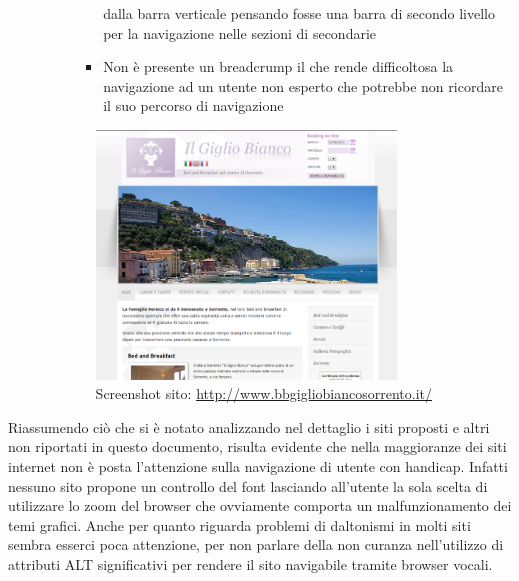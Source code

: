 \documentclass[a4paper,12pt,hidelinks]{report}
\begin{document}
\begin{itemize}
\begin{itemize}
\begin{itemize}
\begin{itemize}
	   dalla barra verticale pensando fosse una barra di secondo livello per la navigazione nelle sezioni di secondarie
	   \item Non è presente un breadcrump il che rende difficoltosa la navigazione ad un utente non esperto che potrebbe non ricordare il suo percorso di navigazione
	  \end{itemize}
	\end{itemize}
	\begin{figure}[h!]%
	    \includegraphics[width=0.80\textwidth,keepaspectratio=true]{../img/bebGiglio}
	    \centering
	    \caption{Screenshot sito: \url{http://www.bbgigliobiancosorrento.it/}}%
	    \label{fig:bebGiglio}%
	\end{figure}
    \end{itemize}
  \end{itemize}
  Riassumendo ciò che si è notato analizzando nel dettaglio i siti proposti e altri non riportati in questo documento, risulta evidente che nella maggioranze dei siti internet
  non è posta l'attenzione sulla navigazione di utente con handicap. Infatti nessuno sito propone un controllo del font lasciando all'utente la sola scelta di utilizzare 
  lo zoom del browser che ovviamente comporta un malfunzionamento dei temi grafici. 
  Anche per quanto riguarda problemi di daltonismi in molti siti sembra esserci poca attenzione, per non parlare della non curanza nell'utilizzo di attributi ALT significativi
  per rendere il sito navigabile tramite browser vocali.

\newpage
\end{document}
